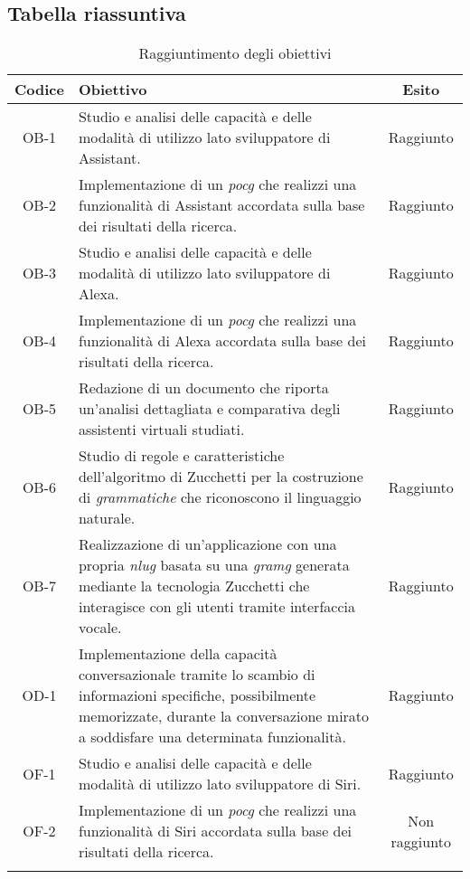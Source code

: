 \subsection{Tabella riassuntiva}
	\begin{longtable}{|c|p{8.5cm}|c|}
		\hline
		\textbf{Codice} & \textbf{Obiettivo} & \textbf{Esito} \\
		\hline
		OB-1 & Studio e analisi delle capacità e delle modalità di utilizzo lato sviluppatore di Assistant. & Raggiunto \\
		\hline
		OB-2 & Implementazione di un \emph{\gls{pocg}} che realizzi una funzionalità di Assistant accordata sulla base dei risultati della ricerca. & Raggiunto \\
		\hline
		OB-3 & Studio e analisi delle capacità e delle modalità di utilizzo lato sviluppatore di Alexa. & Raggiunto \\
		\hline
		OB-4 & Implementazione di un \emph{\gls{pocg}} che realizzi una funzionalità di Alexa accordata sulla base dei risultati della ricerca. & Raggiunto \\
		\hline
		OB-5 & Redazione di un documento che riporta un'analisi dettagliata e comparativa degli assistenti virtuali studiati. & Raggiunto \\
		\hline
		OB-6 & Studio di regole e caratteristiche dell'algoritmo di Zucchetti per la costruzione di \emph{grammatiche} che riconoscono il linguaggio naturale. & Raggiunto \\
		\hline
		OB-7 & Realizzazione di un'applicazione con una propria \emph{\gls{nlug}} basata su una \emph{\gls{gramg}} generata mediante la tecnologia Zucchetti che interagisce con gli utenti tramite interfaccia vocale. & Raggiunto \\
		\hline
		OD-1 & Implementazione della capacità conversazionale tramite lo scambio di informazioni specifiche, possibilmente memorizzate, durante la conversazione mirato a soddisfare una determinata funzionalità. & Raggiunto \\	
		\hline
		OF-1 & Studio e analisi delle capacità e delle modalità di utilizzo lato sviluppatore di Siri. & Raggiunto \\	
		\hline
		OF-2 & Implementazione di un \emph{\gls{pocg}} che realizzi una funzionalità di Siri accordata sulla base dei risultati della ricerca. & Non raggiunto\\	
		\hline
		\caption{Raggiuntimento degli obiettivi}
	\end{longtable}
